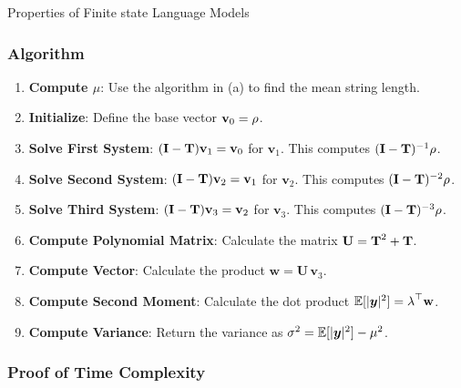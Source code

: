 \begin{question}{Properties of Finite state Language Models}
\begin{subquestion}
\subsubsection*{Algorithm}
\begin{enumerate}
    \item \textbf{Compute $\mu$}: Use the algorithm in (a) to find the mean string length.
    \item \textbf{Initialize}: Define the base vector $\mathbf{v}_0 = \finalf$.
    \item \textbf{Solve First System}: $(\mathbf{I} - \transMtx) \mathbf{v}_1 = \mathbf{v}_0$ for $\mathbf{v}_1$. This computes $(\mathbf{I} - \transMtx)^{-1}\finalf$.
    \item \textbf{Solve Second System}: $(\mathbf{I} - \transMtx) \mathbf{v}_2 = \mathbf{v}_1$ for $\mathbf{v}_2$. This computes $(\mathbf{I} - \transMtx)^{-2}\finalf$.
    \item \textbf{Solve Third System}: $(\mathbf{I} - \transMtx) \mathbf{v}_3 = \mathbf{v}_2$ for $\mathbf{v}_3$. This computes $(\mathbf{I} - \transMtx)^{-3}\finalf$.
    \item \textbf{Compute Polynomial Matrix}: Calculate the matrix $\mathbf{U} = \transMtx^2 + \transMtx$.
    \item \textbf{Compute Vector}: Calculate the product $\mathbf{w} = \mathbf{U}\, \mathbf{v}_3$.
    \item \textbf{Compute Second Moment}: Calculate the dot product $\expectation[|\str|^2] = \initf^\top \mathbf{w}$.
    \item \textbf{Compute Variance}: Return the variance as $\sigma^2 = \expectation[|\str|^2] - \mu^2$.
\end{enumerate}

\subsubsection*{Proof of Time Complexity}


\end{subquestion}
\end{question}
